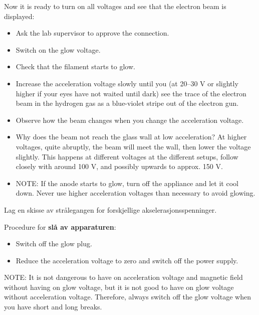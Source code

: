 \documentclass[../Elmag-labhefte-2020.tex]{subfiles}
\begin{document}
{\itsf Now it is ready to turn on all voltages and see that the electron beam is displayed:}
\vspace{-4mm}
\begin{itemize}
\item Ask the lab supervisor to approve the connection.
\item Switch on the glow voltage.
\item Check that the filament starts to glow.
\item Increase the acceleration voltage slowly until you (at 20--30 V or slightly higher if your eyes have not waited until dark) see
the trace of the electron beam in the hydrogen gas as a blue-violet stripe out of the electron gun.
\item Observe how the beam changes when you change the acceleration voltage.
\item Why does the beam not reach the glass wall at low acceleration? At higher voltages, quite abruptly, the beam will meet the wall, then lower the voltage slightly. This happens at different voltages at the different setups, follow closely with around 100 V, and possibly upwards to approx. 150 V.
\item NOTE: If the anode starts to glow, turn off the appliance and let it cool down. Never use higher acceleration voltages than necessary to avoid glowing.
\end{itemize}

{\itsf Lag en skisse av strålegangen for forskjellige akselerasjonsspenninger.}
%


Procedure for \textbf{slå av apparaturen}:
\vspace{-4mm}
\begin{itemize}
\item Switch off the glow plug.
\item Reduce the acceleration voltage to zero and switch off the power supply.
\end{itemize}
NOTE: It is not dangerous to have on acceleration voltage and magnetic field without having on glow voltage, but it is not good to have on glow voltage without acceleration voltage. Therefore, always switch off the glow voltage when you have short and long breaks.
\end{document}
